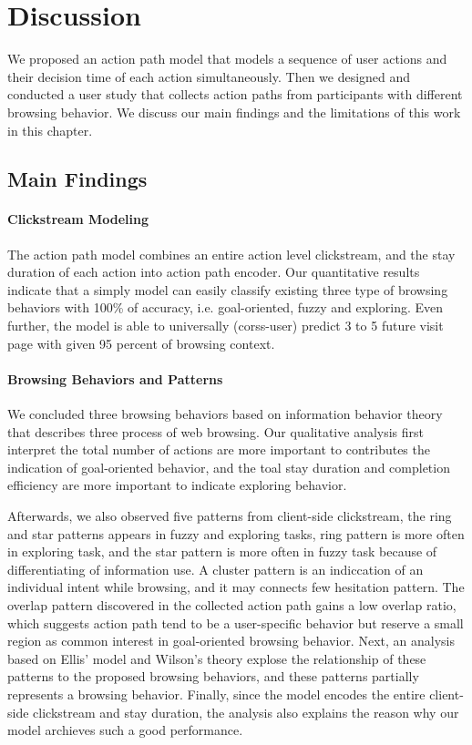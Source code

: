 \section{Discussion}
\label{ch:discuss}

We proposed an action path model that models a sequence of user actions
and their decision time of each action simultaneously.
Then we designed and conducted a user study that collects action paths
from participants with different browsing behavior.
We discuss our main findings and the limitations of this work in this chapter.

\subsection{Main Findings}

\paragraph{Clickstream Modeling}

The action path model combines an entire action level clickstream, 
and the stay duration of each action into action path encoder.
Our quantitative results indicate that 
a simply model can easily classify existing three type of browsing
behaviors with 100\% of accuracy, i.e. goal-oriented, fuzzy and exploring.
Even further, the model is able to universally (corss-user) predict 3 to 5 future visit 
page with given 95 percent of browsing context.

\paragraph{Browsing Behaviors and Patterns}

We concluded three browsing behaviors based on information behavior theory that describes
three process of web browsing.
Our qualitative analysis 
first interpret the total number of actions 
are more important to contributes the indication of goal-oriented behavior,
and the toal stay duration and completion efficiency are more important to indicate exploring behavior.

Afterwards, we also observed five patterns from client-side clickstream, the ring and star patterns
appears in fuzzy and exploring tasks, ring pattern is more often in exploring task,
and the star pattern is more often in fuzzy task because of differentiating of information use.
A cluster pattern is an indiccation of an individual intent while browsing, and it may connects
few hesitation pattern.
The overlap pattern discovered in the collected action path gains a low overlap ratio,
which suggests action path tend to be a user-specific behavior but reserve a small region as
common interest in goal-oriented browsing behavior.
Next, an analysis based on Ellis' model and Wilson's theory explose the relationship 
of these patterns to the proposed browsing behaviors, and these patterns partially represents a browsing behavior.
Finally, since the model encodes the entire client-side clickstream and stay duration,
the analysis also explains the reason why our model archieves such a good performance.

